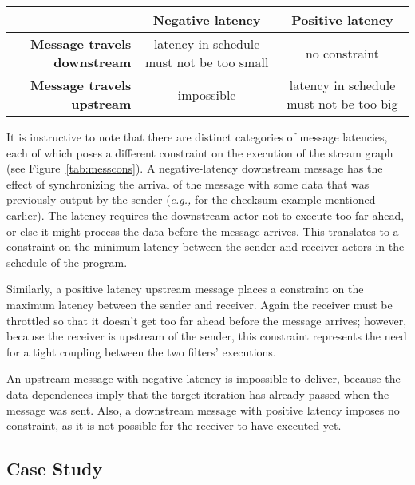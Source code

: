 \begin{table*}[t]
\begin{center}
{\small
\begin{tabular}{|r|c|c|} \hline
~ & {\bf Negative latency} & {\bf Positive latency} \\ \hline
{\bf Message travels downstream} & latency in schedule must not be too small & no constraint \\ \hline
{\bf Message travels upstream} & impossible & latency in schedule must not be too big \\ \hline
\end{tabular}}
\caption{\small Effect of message direction and latency on stream graph execution.}
\label{tab:messcons}
\end{center}
\end{table*}

It is instructive to note that there are distinct categories of
message latencies, each of which poses a different constraint on the
execution of the stream graph (see Figure~\ref{tab:messcons}).  A
negative-latency downstream message has the effect of synchronizing
the arrival of the message with some data that was previously output
by the sender ({\it e.g.,} for the checksum example mentioned
earlier).  The latency requires the downstream actor not to execute
too far ahead, or else it might process the data before the message
arrives.  This translates to a constraint on the minimum latency
between the sender and receiver actors in the schedule of the program.

Similarly, a positive latency upstream message places a constraint on
the maximum latency between the sender and receiver.  Again the
receiver must be throttled so that it doesn't get too far ahead before
the message arrives; however, because the receiver is upstream of the
sender, this constraint represents the need for a tight coupling
between the two filters' executions.

An upstream message with negative latency is impossible to deliver,
because the data dependences imply that the target iteration has
already passed when the message was sent.  Also, a downstream message
with positive latency imposes no constraint, as it is not possible for
the receiver to have executed yet.

%

\subsection{Case Study}

